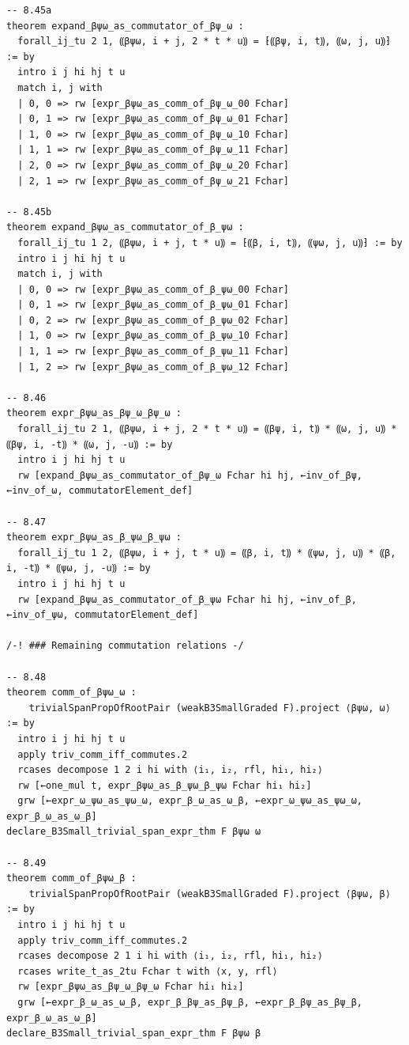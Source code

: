 \begin{Verbatim}
-- 8.45a
theorem expand_βψω_as_commutator_of_βψ_ω :
  forall_ij_tu 2 1, ⸨βψω, i + j, 2 * t * u⸩ = ⁅⸨βψ, i, t⸩, ⸨ω, j, u⸩⁆ := by
  intro i j hi hj t u
  match i, j with
  | 0, 0 => rw [expr_βψω_as_comm_of_βψ_ω_00 Fchar]
  | 0, 1 => rw [expr_βψω_as_comm_of_βψ_ω_01 Fchar]
  | 1, 0 => rw [expr_βψω_as_comm_of_βψ_ω_10 Fchar]
  | 1, 1 => rw [expr_βψω_as_comm_of_βψ_ω_11 Fchar]
  | 2, 0 => rw [expr_βψω_as_comm_of_βψ_ω_20 Fchar]
  | 2, 1 => rw [expr_βψω_as_comm_of_βψ_ω_21 Fchar]

-- 8.45b
theorem expand_βψω_as_commutator_of_β_ψω :
  forall_ij_tu 1 2, ⸨βψω, i + j, t * u⸩ = ⁅⸨β, i, t⸩, ⸨ψω, j, u⸩⁆ := by
  intro i j hi hj t u
  match i, j with
  | 0, 0 => rw [expr_βψω_as_comm_of_β_ψω_00 Fchar]
  | 0, 1 => rw [expr_βψω_as_comm_of_β_ψω_01 Fchar]
  | 0, 2 => rw [expr_βψω_as_comm_of_β_ψω_02 Fchar]
  | 1, 0 => rw [expr_βψω_as_comm_of_β_ψω_10 Fchar]
  | 1, 1 => rw [expr_βψω_as_comm_of_β_ψω_11 Fchar]
  | 1, 2 => rw [expr_βψω_as_comm_of_β_ψω_12 Fchar]

-- 8.46
theorem expr_βψω_as_βψ_ω_βψ_ω :
  forall_ij_tu 2 1, ⸨βψω, i + j, 2 * t * u⸩ = ⸨βψ, i, t⸩ * ⸨ω, j, u⸩ * ⸨βψ, i, -t⸩ * ⸨ω, j, -u⸩ := by
  intro i j hi hj t u
  rw [expand_βψω_as_commutator_of_βψ_ω Fchar hi hj, ←inv_of_βψ, ←inv_of_ω, commutatorElement_def]

-- 8.47
theorem expr_βψω_as_β_ψω_β_ψω :
  forall_ij_tu 1 2, ⸨βψω, i + j, t * u⸩ = ⸨β, i, t⸩ * ⸨ψω, j, u⸩ * ⸨β, i, -t⸩ * ⸨ψω, j, -u⸩ := by
  intro i j hi hj t u
  rw [expand_βψω_as_commutator_of_β_ψω Fchar hi hj, ←inv_of_β, ←inv_of_ψω, commutatorElement_def]

/-! ### Remaining commutation relations -/

-- 8.48
theorem comm_of_βψω_ω :
    trivialSpanPropOfRootPair (weakB3SmallGraded F).project ⟨βψω, ω⟩ := by
  intro i j hi hj t u
  apply triv_comm_iff_commutes.2
  rcases decompose 1 2 i hi with ⟨i₁, i₂, rfl, hi₁, hi₂⟩
  rw [←one_mul t, expr_βψω_as_β_ψω_β_ψω Fchar hi₁ hi₂]
  grw [←expr_ω_ψω_as_ψω_ω, expr_β_ω_as_ω_β, ←expr_ω_ψω_as_ψω_ω, expr_β_ω_as_ω_β]
declare_B3Small_trivial_span_expr_thm F βψω ω

-- 8.49
theorem comm_of_βψω_β :
    trivialSpanPropOfRootPair (weakB3SmallGraded F).project ⟨βψω, β⟩ := by
  intro i j hi hj t u
  apply triv_comm_iff_commutes.2
  rcases decompose 2 1 i hi with ⟨i₁, i₂, rfl, hi₁, hi₂⟩
  rcases write_t_as_2tu Fchar t with ⟨x, y, rfl⟩
  rw [expr_βψω_as_βψ_ω_βψ_ω Fchar hi₁ hi₂]
  grw [←expr_β_ω_as_ω_β, expr_β_βψ_as_βψ_β, ←expr_β_βψ_as_βψ_β, expr_β_ω_as_ω_β]
declare_B3Small_trivial_span_expr_thm F βψω β


\end{Verbatim}

